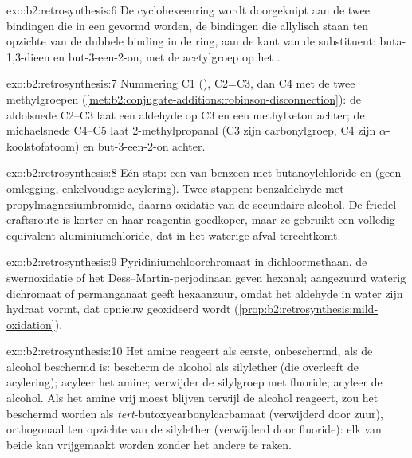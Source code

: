 \begin{solution}{exo:b2:retrosynthesis:6}
De cyclohexeenring wordt doorgeknipt aan de twee bindingen  die in een  gevormd worden, de
bindingen die allylisch staan ten opzichte van de dubbele binding in de ring, aan de kant van de substituent: buta-1,3-dieen en but-3-een-2-on, met de
acetylgroep op het .
\end{solution}

\begin{solution}{exo:b2:retrosynthesis:7}
Nummering C1 (), C2=C3, dan C4 met de twee methylgroepen
(\cref{met:b2:conjugate-additions:robinson-disconnection}): de aldolsnede C2--C3 laat een aldehyde
op C3 en een methylketon achter; de michaelsnede C4--C5 laat 2-methylpropanal (C3 zijn carbonylgroep, C4 zijn
$\alpha$-koolstofatoom) en but-3-een-2-on achter.
\end{solution}

\begin{solution}{exo:b2:retrosynthesis:8}
Eén stap: een  van benzeen met butanoylchloride en  (geen omlegging,
enkelvoudige acylering). Twee stappen: benzaldehyde met propylmagnesiumbromide, daarna oxidatie van de secundaire
alcohol. De friedel-craftsroute is korter en haar reagentia goedkoper, maar ze gebruikt een volledig equivalent
aluminiumchloride, dat in het waterige afval terechtkomt.
\end{solution}

\begin{solution}{exo:b2:retrosynthesis:9}
Pyridiniumchloorchromaat in dichloormethaan, de swernoxidatie of het Dess--Martin-perjodinaan
geven hexanal; aangezuurd waterig dichromaat of permanganaat geeft hexaanzuur, omdat het
aldehyde in water zijn hydraat vormt, dat opnieuw geoxideerd wordt (\cref{prop:b2:retrosynthesis:mild-oxidation}).
\end{solution}

\begin{solution}{exo:b2:retrosynthesis:10}
Het amine reageert als eerste, onbeschermd, als de alcohol beschermd is: bescherm de alcohol als silylether
(die overleeft de acylering); acyleer het amine; verwijder de silylgroep met fluoride; acyleer de
alcohol. Als het amine vrij moest blijven terwijl de alcohol reageert, zou het beschermd worden als
\textit{tert}-butoxycarbonylcarbamaat (verwijderd door zuur), orthogonaal ten opzichte van de silylether (verwijderd door
fluoride): elk van beide kan vrijgemaakt worden zonder het andere te raken.
\end{solution}

